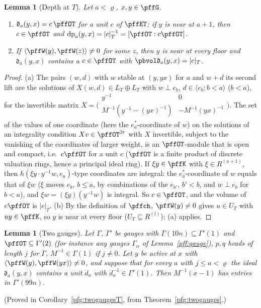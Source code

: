 \documentclass[10pt]{amsart}
\newtheorem{lemma}[theorem]{Lemma}
\theoremstyle{definition}
\theoremstyle{remark}
\begin{document}
\begin{lemma}[Depth at $T$]\label{pff:dideal}
Let $a<\varrho$, $x,y\in\pffG$.
\begin{enumerate}
\item[(a)] $\mathfrak d_a(y,x)=c\,\pffOT$ for a unit $c$ of $\pffET$; if $y$ is near at $a+1$, then
$c\in\pffOT$ and $\operatorname{dp}_a(y,x)=|c|_T^{-1}=[\pffOT:c\pffOT]$.
\item[(b)] If $\langle\pffW(y),\pffW(z)\rangle\ne0$ for some $z$, then $y$ is near at every floor and
$\mathfrak d_a(y,x)$ contains a $c\in\pffOT$ with $\pbvol\mathfrak d_a(y,x)=|c|_T$.
\end{enumerate}
\end{lemma}
\begin{proof}
(a) The pairs $(w,d)$ with $w$ stable at $(y,yx)$ for $a$ and $w+d$ its second lift are the solutions
of $X(w,d)\in L_T\oplus L_T$ with $w\perp e_b$, $d\in\langle e_b:b<a\rangle$ ($b<a$), for the invertible
matrix $X=\bigl(\begin{smallmatrix}y^{-1}&0\\M^{-1}(y^{-1}-(yx)^{-1})&-M^{-1}(yx)^{-1}\end{smallmatrix}\bigr)$.
The set of the values of one coordinate (here the $e_a^*$-coordinate of $w$) on the solutions of an
integrality condition $X v\in\pffOT^{2r}$ with $X$ invertible, subject to the vanishing of the
coordinates of larger weight, is an $\pffOT$-module that is open and compact, i.e.\ $c\pffOT$ for a unit
$c$ ($\pffOT$ is a finite product of discrete valuation rings, hence a principal ideal ring). If
$\xi y\in\pffK$ with $\xi\in R^{(a+1)}$, then $h(\xi y\cdot y^{-1}w,e_a)$-type coordinates are
integral: the $e_a^*$-coordinate of $w$ equals that of $\xi w$ ($\xi$ moves $e_b$, $b\le a$, by
combinations of the $e_{b'}$, $b'<b$, and $w\perp e_b$ for $b<a$), and $\xi w=(\xi y)(y^{-1}w)$ is
integral. So $c\in\pffOT$, and the volume of $c\pffOT$ is $|c|_T$.
(b) By the definition of $\pffch$, $\pffW(y)\ne0$ gives $u\in U_T$ with $uy\in\pffK$, so $y$ is near
at every floor ($U_T\subseteq R^{(l)}$); (a) applies.
\end{proof}

\begin{lemma}[Two gauges]\label{pff:twogauges}
Let
$\Gamma$, $\Gamma'$ be gauges with $\Gamma(10n)\subseteq\Gamma'(1)$ and $\pffOT\subseteq\Gamma'(2)$ (for instance any gauges $\Gamma_\alpha$ of Lemma~\ref{pff:gauge}), $p,q$ heads of length $j$ for
$\Gamma$, $M^{-1}\in\Gamma(1)$ if $j\ne0$. Let $y$ be active at $x$ with $\langle\pffW(y),
\pffW(yx)\rangle\ne0$, and suppose that for every $a$ with $j\le a<\varrho$ the ideal $\mathfrak
d_a(y,x)$ contains a unit $d_a$ with $d_a^{-1}\in\Gamma'(1)$. Then $M^{-1}(x-1)$ has entries in
$\Gamma'(99n)$.
\end{lemma}
(Proved in Corollary~\ref{pfg:twogaugesT}, from Theorem~\ref{pfg:twogauges}.)
\end{document}
